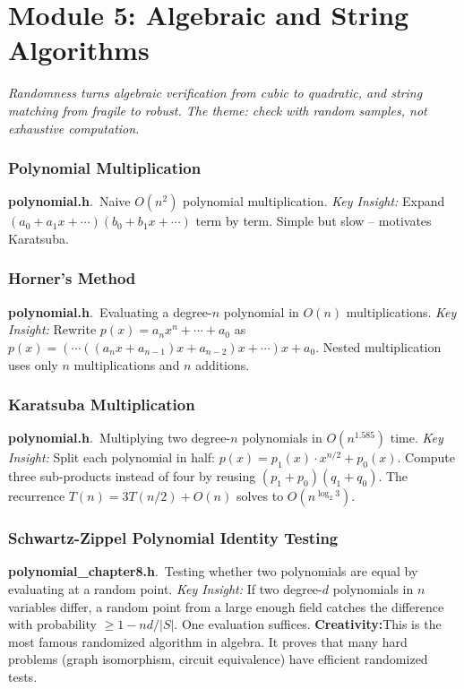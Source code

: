 \documentclass[11pt,a4paper]{article}
\newcommand{\algo}[2]{\textbf{#1}.\ #2}
\newcommand{\insight}{\textit{Key Insight: }}
\newcommand{\creative}{\textcolor{orange!80!black}{\textbf{Creativity:}}}
\begin{document}
\section{Module 5: Algebraic and String Algorithms}
\label{sec:algebraic}

\textit{Randomness turns algebraic verification from cubic to quadratic, and string matching from fragile to robust. The theme: check with random samples, not exhaustive computation.}

\subsubsection{Polynomial Multiplication}
\algo{polynomial.h}{Naive \(O(n^2)\) polynomial multiplication.}
\insight Expand \((a_0 + a_1 x + \cdots)(b_0 + b_1 x + \cdots)\) term by term. Simple but slow -- motivates Karatsuba.

\subsubsection{Horner's Method}
\algo{polynomial.h}{Evaluating a degree-\(n\) polynomial in \(O(n)\) multiplications.}
\insight Rewrite \(p(x) = a_n x^n + \cdots + a_0\) as \(p(x) = (\cdots((a_n x + a_{n-1})x + a_{n-2})x + \cdots)x + a_0\). Nested multiplication uses only \(n\) multiplications and \(n\) additions.

\subsubsection{Karatsuba Multiplication}
\algo{polynomial.h}{Multiplying two degree-\(n\) polynomials in \(O(n^{1.585})\) time.}
\insight Split each polynomial in half: \(p(x) = p_1(x) \cdot x^{n/2} + p_0(x)\). Compute three sub-products instead of four by reusing \((p_1 + p_0)(q_1 + q_0)\). The recurrence \(T(n) = 3T(n/2) + O(n)\) solves to \(O(n^{\log_2 3})\).

\subsubsection{Schwartz-Zippel Polynomial Identity Testing}
\algo{polynomial\_chapter8.h}{Testing whether two polynomials are equal by evaluating at a random point.}
\insight If two degree-\(d\) polynomials in \(n\) variables differ, a random point from a large enough field catches the difference with probability \(\ge 1 - nd/|S|\). One evaluation suffices.
\creative This is the most famous randomized algorithm in algebra. It proves that many hard problems (graph isomorphism, circuit equivalence) have efficient randomized tests.
\end{document}

